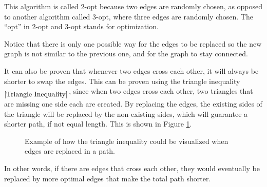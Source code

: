\documentclass{article}
\begin{document}
\noindent
This algorithm is called 2-opt because two edges are randomly chosen, as opposed to another algorithm called 3-opt, where three edges are randomly chosen. The ``opt'' in 2-opt and 3-opt stands for optimization. 

\noindent
Notice that there is only one possible way for the edges to be replaced so the new graph is not similar to the previous one, and for the graph to stay connected.


\noindent
It can also be proven that whenever two edges cross each other, it will always be shorter to swap the edges. This can be proven using the triangle inequality$_{\ref{Triangle Inequality}}$, since when two edges cross each other, two triangles that are missing one side each are created. By replacing the edges, the existing sides of the triangle will be replaced by the non-existing sides, which will guarantee a shorter path, if not equal length. This is shown in Figure \ref{Figure:triangleIneq2opt}.

\begin{figure}[ht]
     \centering
     \caption{Example of how the triangle inequality could be visualized when edges are replaced in a path.}
     \label{Figure:triangleIneq2opt}
\end{figure}

\noindent
In other words, if there are edges that cross each other, they would eventually be replaced by more optimal edges that make the total path shorter.
\end{document}
